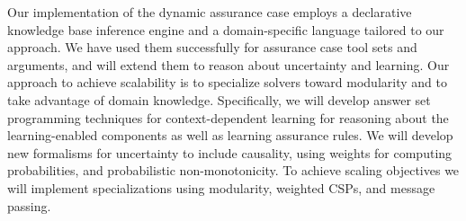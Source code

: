 \documentclass[12pt]{dod-blank}
\begin{document}
Our implementation of the dynamic assurance case employs a declarative knowledge base inference engine and a domain-specific language tailored to our approach.  We have used them successfully for assurance case tool sets and arguments, and will extend them to reason about uncertainty and learning.  Our approach to achieve scalability is to specialize solvers toward modularity and to take advantage of domain knowledge.  Specifically, we will develop answer set programming techniques for context-dependent learning for reasoning about the learning-enabled components as well as learning assurance rules.  We will develop new formalisms for uncertainty to include causality, using weights for computing probabilities, and probabilistic non-monotonicity.  To achieve scaling objectives we will implement specializations using modularity, weighted CSPs, and message passing. 

\end{document}
